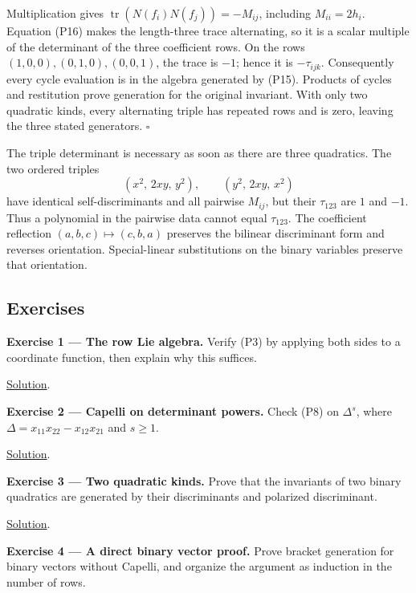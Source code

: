 \documentclass[
]{article}
\begin{document}
Multiplication gives \(\operatorname{tr}(N(f_i)N(f_j))=-M_{ij}\),
including \(M_{ii}=2h_i\). Equation (P16) makes the length-three trace
alternating, so it is a scalar multiple of the determinant of the three
coefficient rows. On the rows \((1,0,0),(0,1,0),(0,0,1)\), the trace is
\(-1\); hence it is \(-\tau_{ijk}\). Consequently every cycle evaluation
is in the algebra generated by (P15). Products of cycles and restitution
prove generation for the original invariant. With only two quadratic
kinds, every alternating triple has repeated rows and is zero, leaving
the three stated generators. \(\square\)

The triple determinant is necessary as soon as there are three
quadratics. The two ordered triples \[
(x^2,\,2xy,\,y^2),\qquad(y^2,\,2xy,\,x^2)
\] have identical self-discriminants and all pairwise \(M_{ij}\), but
their \(\tau_{123}\) are \(1\) and \(-1\). Thus a polynomial in the
pairwise data cannot equal \(\tau_{123}\). The coefficient reflection
\((a,b,c)\mapsto(c,b,a)\) preserves the bilinear discriminant form and
reverses orientation. Special-linear substitutions on the binary
variables preserve that orientation.

\subsection{Exercises}\label{exercises}

\protect{}\label{exercise-1}{}

\textbf{Exercise 1 --- The row Lie algebra.} Verify (P3) by applying
both sides to a coordinate function, then explain why this suffices.

\hyperref[solution-1]{Solution}.

\protect{}\label{exercise-2}{}

\textbf{Exercise 2 --- Capelli on determinant powers.} Check (P8) on
\(\Delta^s\), where \(\Delta=x_{11}x_{22}-x_{12}x_{21}\) and \(s\geq1\).

\hyperref[solution-2]{Solution}.

\protect{}\label{exercise-3}{}

\textbf{Exercise 3 --- Two quadratic kinds.} Prove that the invariants
of two binary quadratics are generated by their discriminants and
polarized discriminant.

\hyperref[solution-3]{Solution}.

\protect{}\label{exercise-4}{}

\textbf{Exercise 4 --- A direct binary vector proof.} Prove bracket
generation for binary vectors without Capelli, and organize the argument
as induction in the number of rows.
\end{document}

